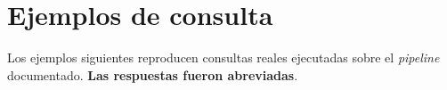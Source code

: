 \documentclass[12pt,a4paper]{article}
\newenvironment{codebox}%
  {\VerbatimEnvironment
   \begin{tcolorbox}[colback=black!3,colframe=black!30,breakable,sharp corners]%
   \begin{Verbatim}[fontsize=\small,breaklines=true,breakanywhere=true]}%
  {\end{Verbatim}\end{tcolorbox}}
\begin{document}




\section{Ejemplos de consulta}
\label{sec:ejemplos}

Los ejemplos siguientes reproducen consultas reales ejecutadas sobre el
\textit{pipeline} documentado. \textbf{Las respuestas fueron abreviadas}.
\end{document}
